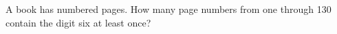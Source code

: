 A book has numbered pages. How many page numbers from one through 130 contain the digit six at least once?
